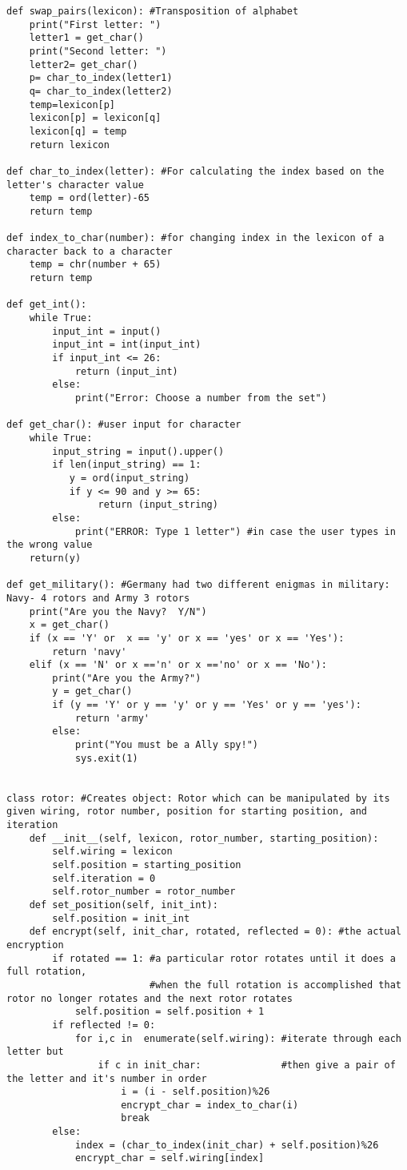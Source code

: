 \documentclass[12pt,letterpaper]{article} %
\begin{document}
\begin{lstlisting}
def swap_pairs(lexicon): #Transposition of alphabet
    print("First letter: ")
    letter1 = get_char()
    print("Second letter: ")
    letter2= get_char()
    p= char_to_index(letter1)
    q= char_to_index(letter2)
    temp=lexicon[p]
    lexicon[p] = lexicon[q]
    lexicon[q] = temp
    return lexicon

def char_to_index(letter): #For calculating the index based on the letter's character value  
    temp = ord(letter)-65
    return temp

def index_to_char(number): #for changing index in the lexicon of a character back to a character
    temp = chr(number + 65)
    return temp

def get_int():
    while True:
        input_int = input()
        input_int = int(input_int)
        if input_int <= 26:
            return (input_int)
        else:
            print("Error: Choose a number from the set")            

def get_char(): #user input for character
    while True:
        input_string = input().upper()
        if len(input_string) == 1:
           y = ord(input_string)
           if y <= 90 and y >= 65:
                return (input_string)
        else:
            print("ERROR: Type 1 letter") #in case the user types in the wrong value
    return(y)

def get_military(): #Germany had two different enigmas in military: Navy- 4 rotors and Army 3 rotors
    print("Are you the Navy?  Y/N")
    x = get_char()   
    if (x == 'Y' or  x == 'y' or x == 'yes' or x == 'Yes'):
        return 'navy'
    elif (x == 'N' or x =='n' or x =='no' or x == 'No'):
        print("Are you the Army?")
        y = get_char()
        if (y == 'Y' or y == 'y' or y == 'Yes' or y == 'yes'):
            return 'army'
        else: 
            print("You must be a Ally spy!")
            sys.exit(1)
        

class rotor: #Creates object: Rotor which can be manipulated by its given wiring, rotor number, position for starting position, and iteration
    def __init__(self, lexicon, rotor_number, starting_position):
        self.wiring = lexicon 
        self.position = starting_position
        self.iteration = 0
        self.rotor_number = rotor_number
    def set_position(self, init_int):
        self.position = init_int
    def encrypt(self, init_char, rotated, reflected = 0): #the actual encryption
        if rotated == 1: #a particular rotor rotates until it does a full rotation,
                         #when the full rotation is accomplished that rotor no longer rotates and the next rotor rotates 
            self.position = self.position + 1
        if reflected != 0: 
            for i,c in  enumerate(self.wiring): #iterate through each letter but 
                if c in init_char:              #then give a pair of the letter and it's number in order
                    i = (i - self.position)%26
                    encrypt_char = index_to_char(i)
                    break
        else:
            index = (char_to_index(init_char) + self.position)%26
            encrypt_char = self.wiring[index]
        

\end{lstlisting}
\end{document}
